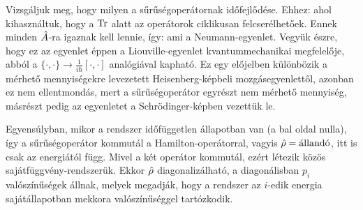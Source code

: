   Vizsgáljuk meg, hogy milyen a sűrűségoperátornak időfejlődése. Ehhez:
  ahol kihasználtuk, hogy a $\mathop{\mathrm{Tr}}\nolimits$ alatt az operátorok ciklikusan felcserélhetőek. Ennek minden $\hat{A}$-ra igaznak kell lennie, így:
  ami a Neumann-egyenlet. Vegyük észre, hogy ez az egyenlet éppen a Liouville-egyenlet kvantummechanikai megfelelője, abból a $\{\cdot,\cdot\}\to\frac{1}{i\hbar}[\cdot,\cdot]$ analógiával kapható. Ez egy előjelben különbözik a mérhető mennyiségekre levezetett Heisenberg-képbeli mozgásegyenlettől, azonban ez nem ellentmondás, mert a sűrűségoperátor egyrészt nem mérhető mennyiség, másrészt pedig az egyenletet a Schrödinger-képben vezettük le.
  
  Egyensúlyban, mikor a rendszer időfüggetlen állapotban van (a bal oldal nulla), így a sűrűségoperátor kommutál a Hamilton-operátorral, vagyis $\hat{\rho}=\text{állandó}$, itt is csak az energiától függ. Mivel a két operátor kommutál, ezért létezik közös sajátfüggvény-rendszerük. Ekkor $\hat{\rho}$ diagonalizálható, a diagonálisban $p_i$ valószínűségek állnak, melyek megadják, hogy a rendszer az $i$-edik energia sajátállapotban mekkora valószínűséggel tartózkodik.
  
  

